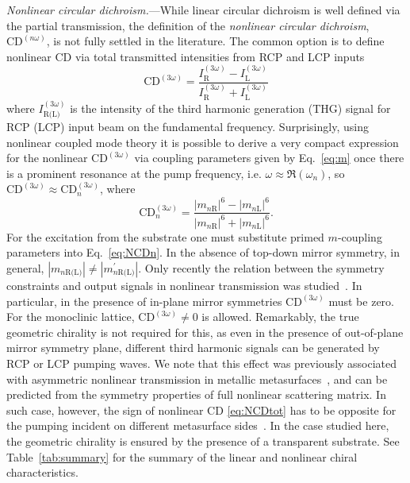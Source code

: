 \documentclass[
    reprint,
    superscriptaddress,
    a4paper,
    amsmath,amssymb,
    prb,
]{revtex4-2}
\begin{document}
\textit{Nonlinear circular dichroism.}---While linear circular dichroism is well defined via the partial transmission, the definition of the \textit{nonlinear circular dichroism}, $\mathrm{CD}^{(n \omega)}$, is not fully settled in the literature.
The common option is to define nonlinear CD via total transmitted intensities from RCP and LCP inputs~\cite{SM,Petralli-Mallow1993JPhysChem,Kim2020NanoLett,Frizyuk2021NanoLett,Tang2020LaserPhotonicsRev}
\begin{equation}
    \mathrm{CD}^{(3\omega)} = \frac{I_{\text{R}}^{(3\omega)} - I_{\text{L}}^{(3\omega)}}{I_{\text{R}}^{(3\omega)} + I_{\text{L}}^{(3\omega)}} 
    \label{eq:NCDtot}
\end{equation}
where $I^{(3\omega)}_{\text{R(L)}}$ is the intensity of the third harmonic generation (THG) signal for RCP (LCP) input beam on the fundamental frequency.
Surprisingly, using nonlinear coupled mode theory it is possible to derive a very compact expression for the nonlinear $\mathrm{CD}^{(3\omega)}$ via coupling parameters given by Eq.~\eqref{eq:m} once there is a prominent resonance at the pump frequency, i.e. $\omega \approx \Re ( \omega_n)$, so \(\mathrm{CD}^{(3\omega)} \approx \mathrm{CD}^{(3\omega)}_n\), where~\cite{SM,Koshelev2023ACSPhot}
\begin{equation}
    \mathrm{CD}^{(3\omega)}_n = \frac{|m_{n\text{R}}|^6-|m_{n\text{L}}|^6}{|m_{n\text{R}}|^6+|m_{n\text{L}}|^6}.
    \label{eq:NCDn}
\end{equation}
For the excitation from the substrate one must substitute primed $m$-coupling parameters into Eq.~\eqref{eq:NCDn}. In the absence of top-down mirror symmetry, in general, $|m_{n\text{R(L)}}| \neq |m^{\prime}_{n\text{R(L)}}|$. 
Only recently the relation between the symmetry constraints and output signals in nonlinear transmission was studied~\cite{Koshelev2024JOPT}. In particular, in the presence of in-plane mirror symmetries $\mathrm{CD}^{(3\omega)}$ must be zero. For the monoclinic lattice, $\mathrm{CD}^{(3\omega)} \neq 0$ is allowed.
Remarkably, the true geometric chirality is not required for this, as even in the presence of out-of-plane mirror symmetry plane, different third harmonic signals can be generated by RCP or LCP pumping waves. {We note that this effect was previously associated with asymmetric nonlinear transmission in metallic metasurfaces~\cite{Achouri2018IEEE}, and can be predicted from the symmetry properties of full nonlinear scattering matrix}.  
In such case, however, the sign of nonlinear CD \eqref{eq:NCDtot} has to be opposite for the pumping incident on different metasurface sides~\cite{SM,Koshelev2024JOPT}.
In the case studied here, the geometric chirality is ensured by the presence of a transparent substrate. See Table~\ref{tab:summary} for the summary of the linear and nonlinear chiral characteristics.
\end{document}
